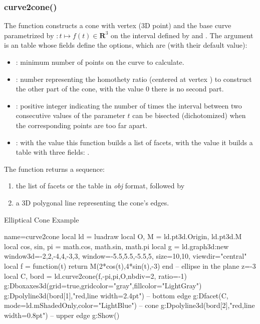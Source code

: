 \subsubsection{curve2cone()}
The function  constructs a cone with vertex  (3D point) and the base curve parametrized by $\colon t\mapsto f(t)\in\mathbf R^3$ on the interval defined by  and . The argument  is an table whose fields define the options, which are (with their default value):
\begin{itemize}
    \item {}: minimum number of points on the curve to calculate.
    
    \item {}: number representing the homothety ratio (centered at vertex ) to construct the other part of the cone, with the value $0$ there is no second part.
     
    \item {}: positive integer indicating the number of times the interval between two consecutive values ​​of the parameter $t$ can be bisected (dichotomized) when the corresponding points are too far apart.
    
    \item {} : with the value \false this function builds a list of facets, with the value \true it builds a table with three fields: .
\end{itemize}
The function returns a sequence:
\begin{enumerate}
    \item the list of facets or the table in \emph{obj} format, followed by
    \item a 3D polygonal line representing the cone's edges.
\end{enumerate}

\begin{demo}{Elliptical Cone Example}
\begin{luadraw}{name=curve2cone}
local ld = luadraw
local O, M = ld.pt3d.Origin, ld.pt3d.M
local cos, sin, pi = math.cos, math.sin, math.pi
local g = ld.graph3d:new{ window3d={-2,2,-4,4,-3,3}, window={-5.5,5.5,-5.5,5},
    size={10,10}, viewdir="central"}
local f = function(t) return M(2*cos(t),4*sin(t),-3) end -- ellipse in the plane z=-3
local C, bord = ld.curve2cone(f,-pi,pi,O,{nbdiv=2, ratio=-1})
g:Dboxaxes3d({grid=true,gridcolor="gray",fillcolor="LightGray"})
g:Dpolyline3d(bord[1],"red,line width=2.4pt") -- bottom edge
g:Dfacet(C, {mode=ld.mShadedOnly,color="LightBlue"}) -- cone
g:Dpolyline3d(bord[2],"red,line width=0.8pt") -- upper edge
g:Show()
\end{luadraw}
\end{demo}

